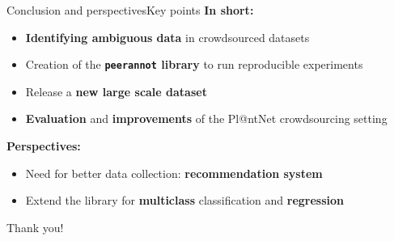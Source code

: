 \begin{frame}{Conclusion and perspectives}{Key points}
\textbf{In short:}
\begin{itemize}
    \item \textbf{Identifying ambiguous data} in crowdsourced datasets
    \item Creation of the \textbf{\texttt{peerannot} library} to run reproducible experiments
    \item Release a \textbf{new large scale dataset}
    \item \textbf{Evaluation} and \textbf{improvements} of the Pl@ntNet crowdsourcing setting
\end{itemize}
    \pause
    \vspace{1cm}
\textbf{Perspectives:}
    \begin{itemize}
        \item Need for better data collection: \textbf{recommendation system}
        \item Extend the library for \textbf{multiclass} classification and \textbf{regression}
    \end{itemize}
    \pause
    \begin{flushright}
        Thank you!
    \end{flushright}
\end{frame}
